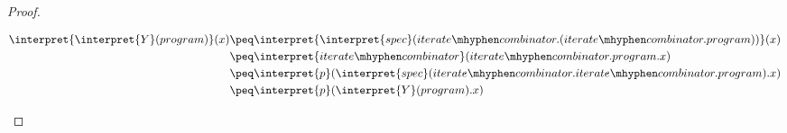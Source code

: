 \begin{proof}
\begin{enumerate}
			\begin{equation*}
				\begin{split}
					\interpret{\interpret{Y}(program)}(x) 
					&\peq \interpret{\interpret{spec}(iterate\mhyphen
				combinator.(iterate\mhyphen combinator.program))}(x)\\
				&\peq \interpret{iterate\mhyphen combinator}(iterate\mhyphen combinator.program.x) \\
				&\peq \interpret{p}(\interpret{spec}(iterate\mhyphen combinator.iterate\mhyphen combinator.program).x)\\
				&\peq \interpret{p}(\interpret{Y}(program).x)
				\end{split}
			\end{equation*}
	\end{enumerate}
\end{proof}

